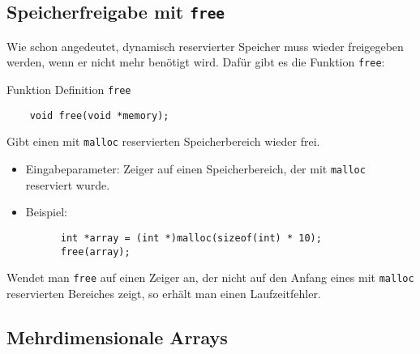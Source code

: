 \subsection{Speicherfreigabe mit \texttt{free}}

Wie schon angedeutet, dynamisch reservierter Speicher muss wieder freigegeben werden, wenn er nicht mehr benötigt wird.
Dafür gibt es die Funktion \verb|free|:
\begin{myexampleblock}{Funktion Definition \texttt{free}}
  \begin{lstlisting}
    void free(void *memory);
  \end{lstlisting}
  Gibt einen mit \verb|malloc| reservierten Speicherbereich wieder frei.
  \begin{itemize}
  \item Eingabeparameter: Zeiger auf einen Speicherbereich, der mit \verb|malloc| reserviert wurde.
  \item Beispiel:
    \begin{lstlisting}
      int *array = (int *)malloc(sizeof(int) * 10);
      free(array);
    \end{lstlisting}
  \end{itemize}
\end{myexampleblock}
Wendet man \verb|free| auf einen Zeiger an, der nicht auf den Anfang eines mit \verb|malloc| reservierten Bereiches zeigt, so erhält man einen Laufzeitfehler.

\subsection{Mehrdimensionale Arrays}

